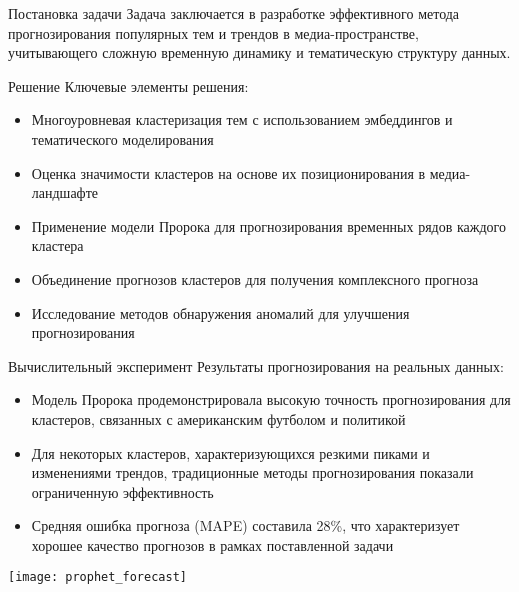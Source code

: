 \documentclass{beamer}
\begin{document}
\begin{frame}{Постановка задачи}
Задача заключается в разработке эффективного метода прогнозирования популярных тем и трендов в медиа-пространстве, учитывающего сложную временную динамику и тематическую структуру данных.
\end{frame}
\begin{frame}{Решение}
Ключевые элементы решения:
\begin{itemize}
    \item Многоуровневая кластеризация тем с использованием эмбеддингов и тематического моделирования
    \item Оценка значимости кластеров на основе их позиционирования в медиа-ландшафте
    \item Применение модели Пророка для прогнозирования временных рядов каждого кластера
    \item Объединение прогнозов кластеров для получения комплексного прогноза
    \item Исследование методов обнаружения аномалий для улучшения прогнозирования
\end{itemize}
\end{frame}
\begin{frame}{Вычислительный эксперимент}
Результаты прогнозирования на реальных данных:
\begin{itemize}
    \item Модель Пророка продемонстрировала высокую точность прогнозирования для кластеров, связанных с американским футболом и политикой
    \item Для некоторых кластеров, характеризующихся резкими пиками и изменениями трендов, традиционные методы прогнозирования показали ограниченную эффективность
    \item Средняя ошибка прогноза (MAPE) составила 28\%, что характеризует хорошее качество прогнозов в рамках поставленной задачи
\end{itemize}
\texttt{[image: prophet\_forecast]}
\end{frame}
\end{document}
